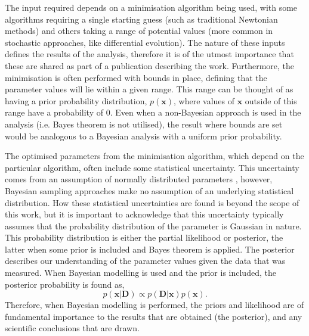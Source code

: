 \documentclass[reprint,superscriptaddress,aps,amsmath,linenumbers]{revtex4-2}
\begin{document}
The input required depends on a minimisation algorithm being used, with some algorithms requiring a single starting guess (such as traditional Newtonian methods) and others taking a range of potential values (more common in stochastic approaches, like differential evolution). 
The nature of these inputs defines the results of the analysis, therefore it is of the utmost importance that these are shared as part of a publication describing the work. 
Furthermore, the minimisation is often performed with bounds in place, defining that the parameter values will lie within a given range. 
This range can be thought of as having a prior probability distribution, $p(\mathbf{x})$, where values of $\mathbf{x}$ outside of this range have a probability of \num{0}. 
Even when a non-Bayesian approach is used in the analysis (i.e. Bayes theorem is not utilised), the result where bounds are set would be analogous to a Bayesian analysis with a uniform prior probability. 

The optimised parameters from the minimisation algorithm, which depend on the particular algorithm, often include some statistical uncertainty.
This uncertainty comes from an assumption of normally distributed parameters \cite{bevington_data_2002}, however, Bayesian sampling approaches make no assumption of an underlying statistical distribution.
How these statistical uncertainties are found is beyond the scope of this work, but it is important to acknowledge that this uncertainty typically assumes that the probability distribution of the parameter is Gaussian in nature. 
This probability distribution is either the partial likelihood or posterior, the latter when some prior is included and Bayes theorem is applied. The posterior describes our understanding of the parameter values given the data that was measured.
When Bayesian modelling is used and the prior is included, the posterior probability is found as, 
%
\begin{equation}
  p(\mathbf{x} | \mathbf{D}) \propto p(\mathbf{D} | \mathbf{x}) p(\mathbf{x}).
  \label{equ:bayes}
\end{equation}
%
Therefore, when Bayesian modelling is performed, the priors and likelihood are of fundamental importance to the results that are obtained (the posterior), and any scientific conclusions that are drawn. 
\end{document}

